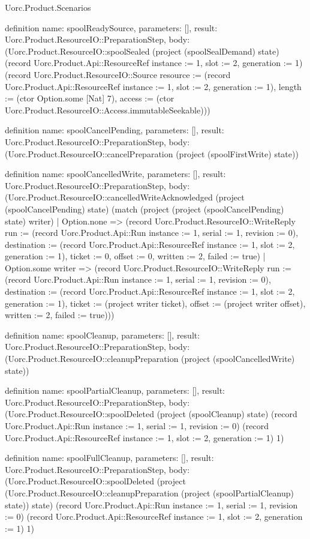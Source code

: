 \begin{lexlean}{Uorc.Product.Scenarios}
\begin{semanticmodule}
definition{
  name: spoolReadySource,
  parameters: [],
  result: Uorc.Product.ResourceIO::PreparationStep,
  body: (Uorc.Product.ResourceIO::spoolSealed (project (spoolSealDemand) state) (record Uorc.Product.Api::ResourceRef {instance := 1, slot := 2, generation := 1}) (record Uorc.Product.ResourceIO::Source {resource := (record Uorc.Product.Api::ResourceRef {instance := 1, slot := 2, generation := 1}), length := (ctor Option.some [Nat] 7), access := (ctor Uorc.Product.ResourceIO::Access.immutableSeekable)}))
}

definition{
  name: spoolCancelPending,
  parameters: [],
  result: Uorc.Product.ResourceIO::PreparationStep,
  body: (Uorc.Product.ResourceIO::cancelPreparation (project (spoolFirstWrite) state))
}

definition{
  name: spoolCancelledWrite,
  parameters: [],
  result: Uorc.Product.ResourceIO::PreparationStep,
  body: (Uorc.Product.ResourceIO::cancelledWriteAcknowledged (project (spoolCancelPending) state) (match (project (project (spoolCancelPending) state) writer)
    | Option.none => (record Uorc.Product.ResourceIO::WriteReply {run := (record Uorc.Product.Api::Run {instance := 1, serial := 1, revision := 0}), destination := (record Uorc.Product.Api::ResourceRef {instance := 1, slot := 2, generation := 1}), ticket := 0, offset := 0, written := 2, failed := true})
    | Option.some writer => (record Uorc.Product.ResourceIO::WriteReply {run := (record Uorc.Product.Api::Run {instance := 1, serial := 1, revision := 0}), destination := (record Uorc.Product.Api::ResourceRef {instance := 1, slot := 2, generation := 1}), ticket := (project writer ticket), offset := (project writer offset), written := 2, failed := true})))
}

definition{
  name: spoolCleanup,
  parameters: [],
  result: Uorc.Product.ResourceIO::PreparationStep,
  body: (Uorc.Product.ResourceIO::cleanupPreparation (project (spoolCancelledWrite) state))
}

definition{
  name: spoolPartialCleanup,
  parameters: [],
  result: Uorc.Product.ResourceIO::PreparationStep,
  body: (Uorc.Product.ResourceIO::spoolDeleted (project (spoolCleanup) state) (record Uorc.Product.Api::Run {instance := 1, serial := 1, revision := 0}) (record Uorc.Product.Api::ResourceRef {instance := 1, slot := 2, generation := 1}) 1)
}

definition{
  name: spoolFullCleanup,
  parameters: [],
  result: Uorc.Product.ResourceIO::PreparationStep,
  body: (Uorc.Product.ResourceIO::spoolDeleted (project (Uorc.Product.ResourceIO::cleanupPreparation (project (spoolPartialCleanup) state)) state) (record Uorc.Product.Api::Run {instance := 1, serial := 1, revision := 0}) (record Uorc.Product.Api::ResourceRef {instance := 1, slot := 2, generation := 1}) 1)
}


\end{semanticmodule}
\end{lexlean}
